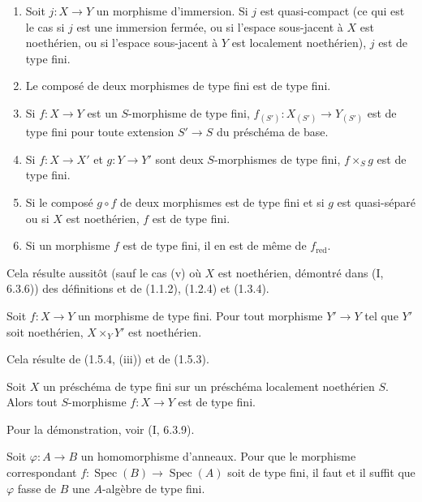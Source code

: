 \begin{proposition}[1.5.4]
\label{IV.1.5.4-fr}
\begin{enumerate}
  \item[(i)] Soit $j:X\to Y$ un morphisme d'immersion. Si $j$ est
  quasi-compact (ce qui est le cas si $j$ est une immersion fermée, ou si
  l'espace sous-jacent à $X$ est noethérien, ou si l'espace sous-jacent à $Y$
  est localement noethérien), $j$ est de type fini.
  \item[(ii)] Le composé de deux morphismes de type fini est de type fini.
  \item[(iii)] Si $f:X\to Y$ est un $S$-morphisme de type fini,
  $f_{(S')}:X_{(S')}\to Y_{(S')}$ est de type fini pour toute extension
  $S'\to S$ du préschéma de base.
  \item[(iv)] Si $f:X\to X'$ et $g:Y\to Y'$ sont deux $S$-morphismes de type
  fini, $f\times_Sg$ est de type fini.
  \item[(v)] Si le composé $g\circ f$ de deux morphismes est de type fini et
  si $g$ est quasi-séparé ou si $X$ est noethérien, $f$ est de type fini.
  \item[(vi)] Si un morphisme $f$ est de type fini, il en est de même de
  $f_{\mathrm{red}}$.
\end{enumerate}
\end{proposition}

Cela résulte aussitôt (sauf le cas (v) où $X$ est noethérien, démontré dans
(I, 6.3.6)) des définitions et de (1.1.2), (1.2.4) et (1.3.4).

\begin{corollary}[1.5.5]
\label{IV.1.5.5-fr}
Soit $f:X\to Y$ un morphisme de type fini. Pour tout morphisme $Y'\to Y$ tel
que $Y'$ soit noethérien, $X\times_YY'$ est noethérien.
\end{corollary}

Cela résulte de (1.5.4, (iii)) et de (1.5.3).

\begin{corollary}[1.5.6]
\label{IV.1.5.6-fr}
Soit $X$ un préschéma de type fini sur un préschéma localement noethérien $S$.
Alors tout $S$-morphisme $f:X\to Y$ est de type fini.
\end{corollary}

Pour la démonstration, voir (I, 6.3.9).

\begin{proposition}[1.5.7]
\label{IV.1.5.7-fr}
Soit $\varphi:A\to B$ un homomorphisme d'anneaux. Pour que le morphisme
correspondant $f:\operatorname{Spec}(B)\to\operatorname{Spec}(A)$ soit de type fini, il faut et il suffit
que $\varphi$ fasse de $B$ une $A$-algèbre de type fini.
\end{proposition}

